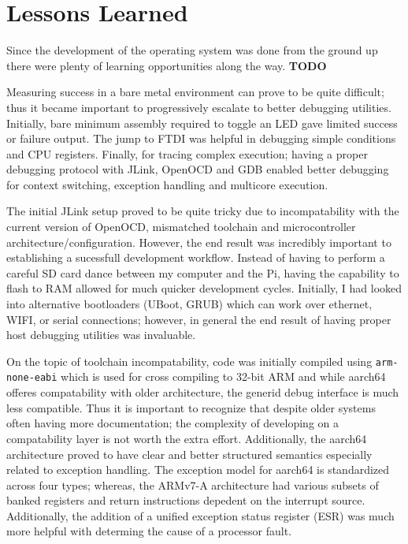\documentclass[11pt]{article}
\begin{document}
\section{Lessons Learned}
\label{sec:lessons}
Since the development of the operating system was done from the ground up there were plenty of learning opportunities along the way. 
\textbf{TODO} 

Measuring success in a bare metal environment can prove to be quite difficult; thus it became important to progressively escalate to better debugging utilities.  Initially, bare minimum assembly required to toggle an LED gave limited success or failure output.  The jump to FTDI was helpful in debugging simple conditions and CPU registers.  Finally, for tracing complex execution; having a proper debugging protocol with JLink, OpenOCD and GDB enabled better debugging for context switching, exception handling and multicore execution.

The initial JLink setup proved to be quite tricky due to incompatability with the current version of OpenOCD, mismatched toolchain and microcontroller architecture/configuration.  However, the end result was incredibly important to establishing a sucessfull development workflow.  Instead of having to perform a careful SD card dance between my computer and the Pi, having the capability to flash to RAM allowed for much quicker development cycles.  Initially, I had looked into alternative bootloaders (UBoot, GRUB) which can work over ethernet, WIFI, or serial connections; however, in general the end result of having proper host debugging utilities was invaluable.

On the topic of toolchain incompatability, code was initially compiled using \texttt{arm-none-eabi} which is used for cross compiling to 32-bit ARM and while aarch64 offeres compatability with older architecture, the generid debug interface is much less compatible.  Thus it is important to recognize that despite older systems often having more documentation; the complexity of developing on a compatability layer is not worth the extra effort.  Additionally, the aarch64 architecture proved to have clear and better structured semantics especially related to exception handling.  The exception model for aarch64 is standardized across four types; whereas, the ARMv7-A architecture had various subsets of banked registers and return instructions depedent on the interrupt source.  Additionally, the addition of a unified exception status register (ESR) was much more helpful with determing the cause of a processor fault.
\end{document}
